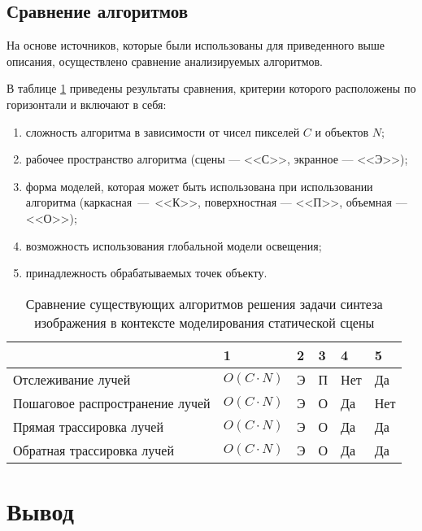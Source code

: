 \subsection{Сравнение алгоритмов}

На основе источников, которые были использованы для приведенного выше описания, осуществлено сравнение анализируемых алгоритмов.

В таблице \ref{tab:compare} приведены результаты сравнения, критерии которого расположены по горизонтали и включают в себя:
\begin{enumerate}
	\item сложность алгоритма в зависимости от чисел пикселей $C$ и объектов $N$;
	\item рабочее пространство алгоритма (сцены --- <<С>>, экранное --- <<Э>>);
	\item форма моделей, которая может быть использована при использовании алгоритма (каркасная~---~<<К>>, поверхностная --- <<П>>, объемная --- <<О>>);
	\item возможность использования глобальной модели освещения;
	\item принадлежность обрабатываемых точек объекту.
\end{enumerate}

\begin{table}[hbtp]
	\begin{center}
		\begin{flushleft}
			\caption{\label{tab:compare}Сравнение существующих алгоритмов решения задачи синтеза изображения в контексте моделирования статической сцены}
		\end{flushleft}
		\begin{tabular}{|l | l | l | l | l | l |} 
			\hline 
			~					& {1} & {2} & {3} & {4} & {5} \\ \hline
			Отслеживание лучей & \texttt{$O(C \cdot N)$} & Э & П  & Нет & Да \\ \hline
			Пошаговое распространение лучей & \texttt{$O(C \cdot N)$} & Э & О & Да & Нет \\ \hline
			Прямая трассировка лучей & \texttt{$O(C \cdot N)$} & Э & О & Да & Да \\ \hline
			Обратная трассировка лучей & \texttt{$O(C \cdot N)$} & Э & О & Да & Да \\ \hline
		\end{tabular}
	\end{center}
\end{table}

\section*{Вывод}


